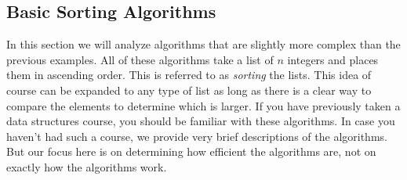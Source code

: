 \subsection{Basic Sorting Algorithms}
In this section we will analyze algorithms that are slightly more complex than the previous examples. 
All of these algorithms take a list of $n$ integers and places them in ascending order. This is referred
to as {\em sorting} the lists. This idea of course can be expanded to any type of list as long as there
is a clear way to compare the elements to determine which is larger.
If you have previously taken a data structures course, you should be familiar with these algorithms.
In case you haven't had such a course, we provide very brief descriptions of the algorithms. 
But our focus here is on determining how efficient the algorithms are, not on exactly how the 
algorithms work.

